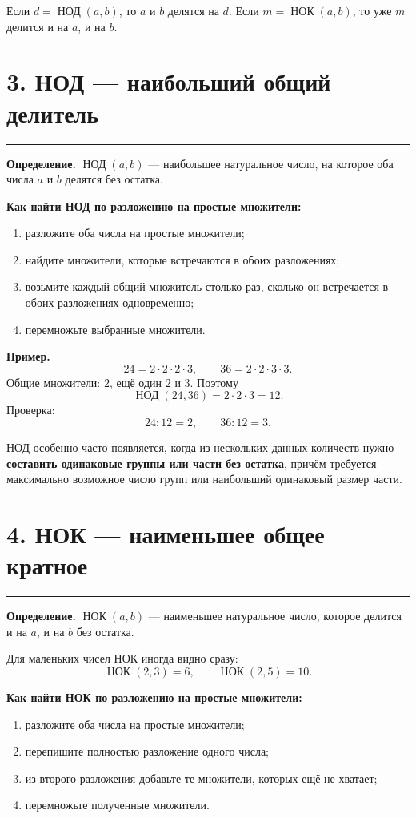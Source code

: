 \documentclass[a4paper,12pt]{article}
\newcommand{\nodru}{\mathop{\text{НОД}}\nolimits}
\newcommand{\nokru}{\mathop{\text{НОК}}\nolimits}
\newcommand{\sectionline}{%
  \vspace{-0.2em}\par\noindent
  {\color{accent}\rule{\linewidth}{0.55pt}}%
  \vspace{0.35em}
}
\newcommand{\keyidea}[1]{%
  \par\noindent{\color{darkaccent}\bfseries #1}\par
}
\begin{document}
Если \(d=\nodru(a,b)\), то \(a\) и \(b\) делятся на \(d\).
Если \(m=\nokru(a,b)\), то уже \(m\) делится и на \(a\), и на \(b\).

\section*{3. НОД --- наибольший общий делитель}
\sectionline

\textbf{Определение.}
\(\nodru(a,b)\) --- наибольшее натуральное число, на которое оба числа \(a\) и \(b\) делятся без остатка.

\textbf{Как найти НОД по разложению на простые множители:}

\begin{enumerate}[leftmargin=8mm,itemsep=2pt,topsep=2pt]
\item разложите оба числа на простые множители;
\item найдите множители, которые встречаются в обоих разложениях;
\item возьмите каждый общий множитель столько раз, сколько он встречается в обоих разложениях одновременно;
\item перемножьте выбранные множители.
\end{enumerate}

\textbf{Пример.}
\[
24=2\cdot2\cdot2\cdot3,
\qquad
36=2\cdot2\cdot3\cdot3.
\]
Общие множители: \(2\), ещё один \(2\) и \(3\). Поэтому
\[
\nodru(24,36)=2\cdot2\cdot3=12.
\]
Проверка:
\[
24:12=2,
\qquad
36:12=3.
\]

\keyidea{Смысл НОД в задачах}

НОД особенно часто появляется, когда из нескольких данных количеств нужно \textbf{составить одинаковые группы или части без остатка}, причём требуется максимально возможное число групп или наибольший одинаковый размер части.

\section*{4. НОК --- наименьшее общее кратное}
\sectionline

\textbf{Определение.}
\(\nokru(a,b)\) --- наименьшее натуральное число, которое делится и на \(a\), и на \(b\) без остатка.

Для маленьких чисел НОК иногда видно сразу:
\[
\nokru(2,3)=6,
\qquad
\nokru(2,5)=10.
\]

\textbf{Как найти НОК по разложению на простые множители:}

\begin{enumerate}[leftmargin=8mm,itemsep=2pt,topsep=2pt]
\item разложите оба числа на простые множители;
\item перепишите полностью разложение одного числа;
\item из второго разложения добавьте те множители, которых ещё не хватает;
\item перемножьте полученные множители.
\end{enumerate}
\end{document}
